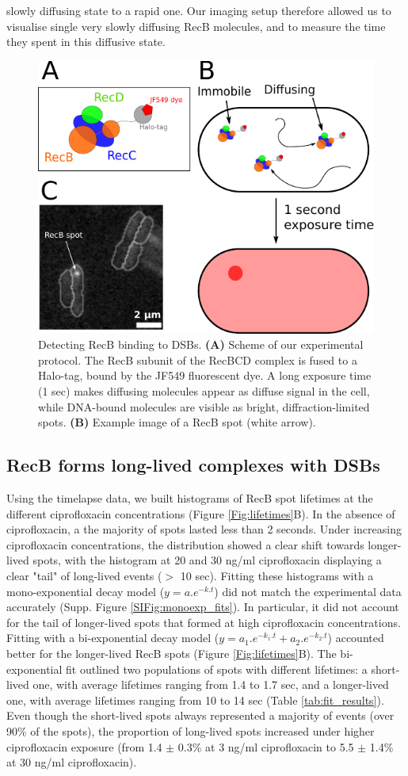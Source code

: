 slowly diffusing state to a rapid one. Our imaging setup therefore allowed us to visualise single very slowly diffusing RecB molecules, and to measure the time they spent in this diffusive state.

\begin{figure}[htbp]
    \centering
    \includegraphics[width=.45\textwidth]{Figures/Fig1_Exp_principle.pdf}
    \caption{Detecting RecB binding to DSBs. \textbf{(A)} Scheme of our experimental protocol. The RecB subunit of the RecBCD complex is fused to a Halo-tag, bound by the JF549 fluorescent dye\cite{Lepore2019a, Lepore2023}. A long exposure time (1 sec) makes diffusing molecules appear as diffuse signal in the cell, while DNA-bound molecules are visible as bright, diffraction-limited spots. \textbf{(B)} Example image of a RecB spot (white arrow).}
    \label{Fig:exp_principle}
\end{figure}

\subsection*{RecB forms long-lived complexes with DSBs}
Using the timelapse data, we built histograms of RecB spot lifetimes at the different ciprofloxacin concentrations (Figure \ref{Fig:lifetimes}B). In the absence of ciprofloxacin, a the majority of spots lasted less than 2 seconds. Under increasing ciprofloxacin concentrations, the distribution showed a clear shift towards longer-lived spots, with the histogram at 20 and 30 ng/ml ciprofloxacin displaying a clear "tail" of long-lived events ($>$ 10 sec). Fitting these histograms with a mono-exponential decay model ($y = a.e^{-k.t}$) did not match the experimental data accurately (Supp. Figure \ref{SIFig:monoexp_fits}). In particular, it did not account for the tail of longer-lived spots that formed at high ciprofloxacin concentrations. Fitting with a bi-exponential decay model ($y = a_1.e^{-k_1.t} + a_2.e^{-k_2.t}$) accounted better for the longer-lived RecB spots (Figure \ref{Fig:lifetimes}B). The bi-exponential fit outlined two populations of spots with different lifetimes: a short-lived one, with average lifetimes ranging from 1.4 to 1.7 sec, and a longer-lived one, with average lifetimes ranging from 10 to 14 sec (Table \ref{tab:fit_results}). Even though the short-lived spots always represented a majority of events (over 90\% of the spots), the proportion of long-lived spots increased under higher ciprofloxacin exposure (from 1.4 $\pm$ 0.3\% at 3 ng/ml ciprofloxacin to 5.5 $\pm$ 1.4\% at 30 ng/ml ciprofloxacin).

